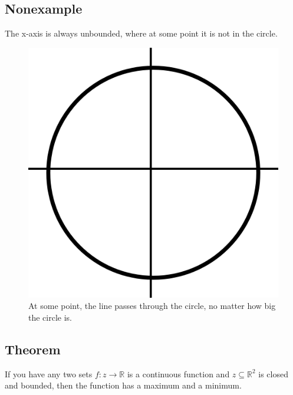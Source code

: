 \documentclass{article}
\begin{document}
\subsection*{Nonexample}
The x-axis is always unbounded, where at some point it is not in the circle.
\begin{figure}[h!]
    \centering
    \includegraphics[scale=.15]{lineInCircle.png}
    \caption{At some point, the line passes through the circle, no matter how big the circle is.}
    \label{}
\end{figure}
\subsection*{Theorem}
If you have any two sets $f:z\rightarrow\mathbb{R}$ is a continuous function and $z\subseteq\mathbb{R}^2$ is closed and bounded, then the function has a maximum and a minimum.
\end{document}
